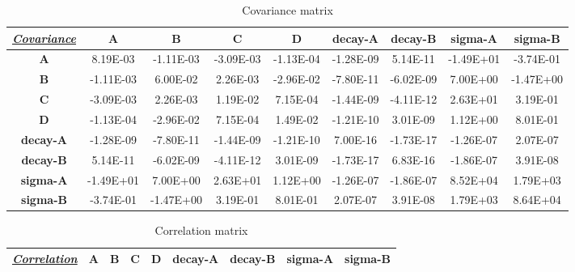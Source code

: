\begin{landscape}
\begin{table}[h!]
\centering
\caption{Covariance matrix}
\label{covarianceComputed}
\begin{tabular}{|c|c|c|c|c|c|c|c|c|}
\hline
{\ul \textit{\textbf{Covariance}}} & \textbf{A} & \textbf{B} & \textbf{C} & \textbf{D} & \textbf{decay-A} & \textbf{decay-B} & \textbf{sigma-A} & \textbf{sigma-B} \\ \hline
\textbf{A}                         & 8.19E-03   & -1.11E-03  & -3.09E-03  & -1.13E-04  & -1.28E-09        & 5.14E-11         & -1.49E+01        & -3.74E-01        \\ \hline
\textbf{B}                         & -1.11E-03  & 6.00E-02   & 2.26E-03   & -2.96E-02  & -7.80E-11        & -6.02E-09        & 7.00E+00         & -1.47E+00        \\ \hline
\textbf{C}                         & -3.09E-03  & 2.26E-03   & 1.19E-02   & 7.15E-04   & -1.44E-09        & -4.11E-12        & 2.63E+01         & 3.19E-01         \\ \hline
\textbf{D}                         & -1.13E-04  & -2.96E-02  & 7.15E-04   & 1.49E-02   & -1.21E-10        & 3.01E-09         & 1.12E+00         & 8.01E-01         \\ \hline
\textbf{decay-A}                   & -1.28E-09  & -7.80E-11  & -1.44E-09  & -1.21E-10  & 7.00E-16         & -1.73E-17        & -1.26E-07        & 2.07E-07         \\ \hline
\textbf{decay-B}                   & 5.14E-11   & -6.02E-09  & -4.11E-12  & 3.01E-09   & -1.73E-17        & 6.83E-16         & -1.86E-07        & 3.91E-08         \\ \hline
\textbf{sigma-A}                   & -1.49E+01  & 7.00E+00   & 2.63E+01   & 1.12E+00   & -1.26E-07        & -1.86E-07        & 8.52E+04         & 1.79E+03         \\ \hline
\textbf{sigma-B}                   & -3.74E-01  & -1.47E+00  & 3.19E-01   & 8.01E-01   & 2.07E-07         & 3.91E-08         & 1.79E+03         & 8.64E+04         \\ \hline
\end{tabular}
\end{table}
\begin{table}[h!]
\centering
\caption{Correlation matrix}
\label{pearsonComputed}
\begin{tabular}{|c|c|c|c|c|c|c|c|c|}
\hline
{\ul \textit{\textbf{Correlation}}} & \textbf{A} & \textbf{B} & \textbf{C} & \textbf{D} & \textbf{decay-A} & \textbf{decay-B} & \textbf{sigma-A} & \textbf{sigma-B} \\ \hline

\end{tabular}
\end{table}
\end{landscape}
